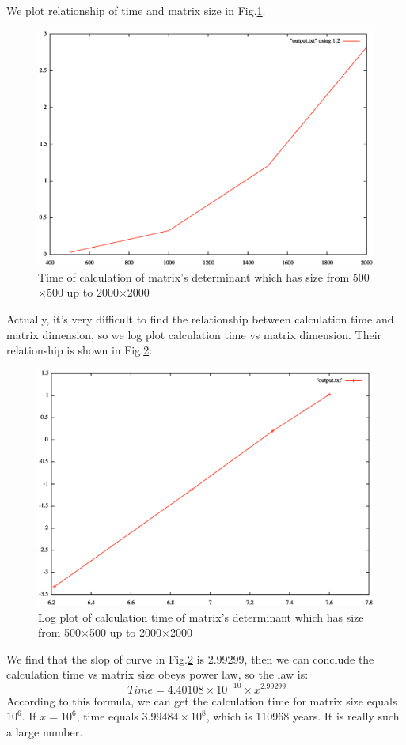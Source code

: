 \documentclass{article}
\begin{document}
 We plot relationship of time and matrix size in Fig.\ref{matrix}.
 \begin{figure}[H]\centering
\includegraphics[width=1.0\textwidth]{m_generator_time2_det.eps}
\caption{Time of calculation of matrix's determinant which has size from 500$\times$500 up to 2000$\times$2000}
\label{matrix}
\end{figure}
Actually, it's very difficult to find the relationship between calculation time and matrix dimension, so we log
plot calculation time  vs matrix dimension. Their relationship is shown in Fig.\ref{matrix2}:
 \begin{figure}[H]\centering
\includegraphics[width=1.0\textwidth]{m_generator_time_log.eps}
\caption{Log plot of calculation time of matrix's determinant which has size from 500$\times$500 up to 2000$\times$2000}
\label{matrix2}
\end{figure}
We find that the slop of curve in Fig.\ref{matrix2} is 2.99299, then we can conclude the calculation time vs matrix size obeys power law, so the law is:
\begin{equation}
\ Time = 4.40108\times10^{-10}\times x^{2.99299}
\end{equation}
According to this formula, we can get the calculation time for matrix size equals $10^6$. If $x = 10^6$, time equals $3.99484\times10^8$, which is 110968 years. It is really such a large number.
\end{document}
